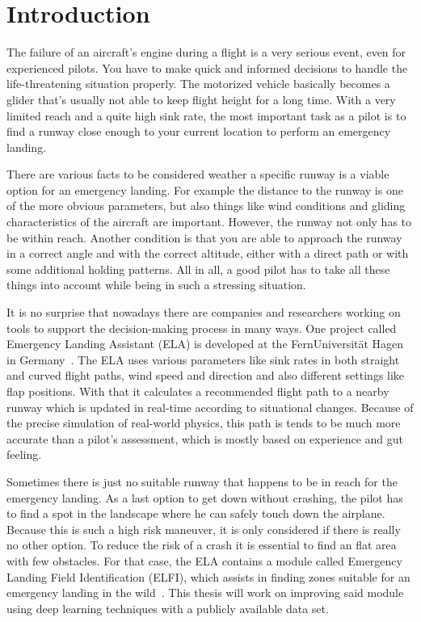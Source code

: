 \section{Introduction}
The failure of an aircraft's engine during a flight is a very serious event, even for experienced pilots. You have to make quick and informed decisions to handle the life-threatening situation properly. The motorized vehicle basically becomes a glider that's usually not able to keep flight height for a long time. With a very limited reach and a quite high sink rate, the most important task as a pilot is to find a runway close enough to your current location to perform an emergency landing.

There are various facts to be considered weather a specific runway is a viable option for an emergency landing. For example the distance to the runway is one of the more obvious parameters, but also things like wind conditions and gliding characteristics of the aircraft are important. However, the runway not only has to be within reach. Another condition is that you are able to approach the runway in a correct angle and with the correct altitude, either with a direct path or with some additional holding patterns. All in all, a good pilot has to take all these things into account while being in such a stressing situation.

It is no surprise that nowadays there are companies and researchers working on tools to support the decision-making process in many ways. One project called Emergency Landing Assistant (ELA) is developed at the FernUniversität Hagen in Germany~\cite{feu_fas}. The ELA uses various parameters like sink rates in both straight and curved flight paths, wind speed and direction and also different settings like flap positions. With that it calculates a recommended flight path to a nearby runway which is updated in real-time according to situational changes. Because of the precise simulation of real-world physics, this path is tends to be much more accurate than a pilot's assessment, which is mostly based on experience and gut feeling.

Sometimes there is just no suitable runway that happens to be in reach for the emergency landing. As a last option to get down without crashing, the pilot has to find a spot in the landscape where he can safely touch down the airplane. Because this is such a high risk maneuver, it is only considered if there is really no other option. To reduce the risk of a crash it is essential to find an flat area with few obstacles. For that case, the ELA contains a module called Emergency Landing Field Identification (ELFI), which assists in finding zones suitable for an emergency landing in the wild~\cite{feu_elfi}. This thesis will work on improving said module using deep learning techniques with a publicly available data set.

